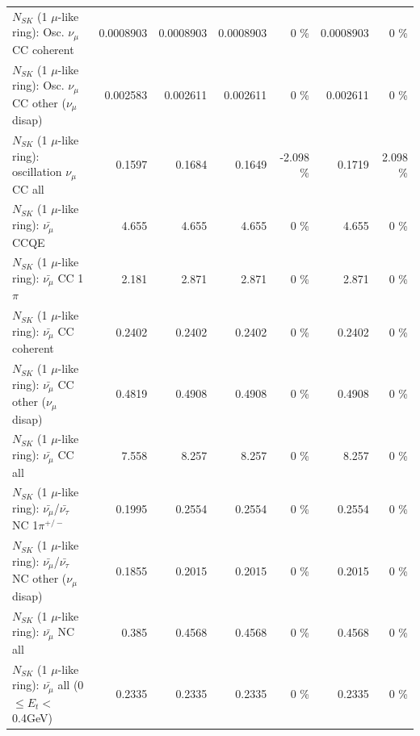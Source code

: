 \begin{table}
\begin{tabular}{| l | r | r | r  r | r  r |}
                        $N_{SK}$ (1 $\mu$-like ring): Osc. $\nu_\mu$ CC coherent &       0.0008903 &       0.0008903 &       0.0008903 &        0 \%  &       0.0008903 &        0 \%  \\ 
         $N_{SK}$ (1 $\mu$-like ring): Osc. $\nu_\mu$ CC other ($\nu_\mu$ disap) &        0.002583 &        0.002611 &        0.002611 &        0 \%  &        0.002611 &        0 \%  \\ 
                      $N_{SK}$ (1 $\mu$-like ring): oscillation $\nu_\mu$ CC all &          0.1597 &          0.1684 &          0.1649 &   -2.098 \%  &          0.1719 &    2.098 \%  \\ 
\hline
\hline
                              $N_{SK}$ (1 $\mu$-like ring): $\bar{\nu_\mu}$ CCQE &           4.655 &           4.655 &           4.655 &        0 \%  &           4.655 &        0 \%  \\ 
                         $N_{SK}$ (1 $\mu$-like ring): $\bar{\nu_\mu}$ CC 1$\pi$ &           2.181 &           2.871 &           2.871 &        0 \%  &           2.871 &        0 \%  \\ 
                       $N_{SK}$ (1 $\mu$-like ring): $\bar{\nu_\mu}$ CC coherent &          0.2402 &          0.2402 &          0.2402 &        0 \%  &          0.2402 &        0 \%  \\ 
        $N_{SK}$ (1 $\mu$-like ring): $\bar{\nu_\mu}$ CC other ($\nu_\mu$ disap) &          0.4819 &          0.4908 &          0.4908 &        0 \%  &          0.4908 &        0 \%  \\ 
                          $N_{SK}$ (1 $\mu$-like ring): $\bar{\nu_{\mu}}$ CC all &           7.558 &           8.257 &           8.257 &        0 \%  &           8.257 &        0 \%  \\ 
\hline
  $N_{SK}$ (1 $\mu$-like ring): $\bar{\nu_\mu}$/$\bar{\nu_\tau}$ NC 1$\pi^{+/-}$ &          0.1995 &          0.2554 &          0.2554 &        0 \%  &          0.2554 &        0 \%  \\ 
$N_{SK}$ (1 $\mu$-like ring): $\bar{\nu_\mu}$/$\bar{\nu_\tau}$ NC other ($\nu_\mu$ disap) &          0.1855 &          0.2015 &          0.2015 &        0 \%  &          0.2015 &        0 \%  \\ 
                          $N_{SK}$ (1 $\mu$-like ring): $\bar{\nu_{\mu}}$ NC all &           0.385 &          0.4568 &          0.4568 &        0 \%  &          0.4568 &        0 \%  \\ 
\hline
   $N_{SK}$ (1 $\mu$-like ring): $\bar{\nu_{\mu}}$ all (0 $\leq E_{t} <$ 0.4GeV) &          0.2335 &          0.2335 &          0.2335 &        0 \%  &          0.2335 &        0 \%  \\ 

\end{tabular}
\end{table}
